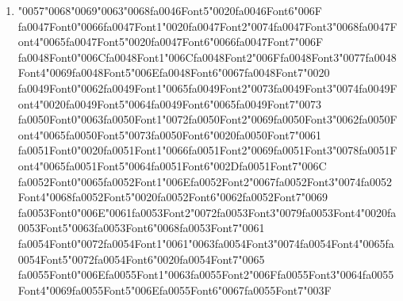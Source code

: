 \documentclass[11pt]{article}
\begin{document}
\begin{enumerate}[leftmargin=*]
  \item {\char"0057}{\char"0068}{\char"0069}{\char"0063}{\char"0068}{\csname fa0046Font5\endcsname\char"0020}{\csname fa0046Font6\endcsname\char"006F} {\csname fa0047Font0\endcsname\char"0066}{\csname fa0047Font1\endcsname\char"0020}{\csname fa0047Font2\endcsname\char"0074}{\csname fa0047Font3\endcsname\char"0068}{\csname fa0047Font4\endcsname\char"0065}{\csname fa0047Font5\endcsname\char"0020}{\csname fa0047Font6\endcsname\char"0066}{\csname fa0047Font7\endcsname\char"006F} {\csname fa0048Font0\endcsname\char"006C}{\csname fa0048Font1\endcsname\char"006C}{\csname fa0048Font2\endcsname\char"006F}{\csname fa0048Font3\endcsname\char"0077}{\csname fa0048Font4\endcsname\char"0069}{\csname fa0048Font5\endcsname\char"006E}{\csname fa0048Font6\endcsname\char"0067}{\csname fa0048Font7\endcsname\char"0020} {\csname fa0049Font0\endcsname\char"0062}{\csname fa0049Font1\endcsname\char"0065}{\csname fa0049Font2\endcsname\char"0073}{\csname fa0049Font3\endcsname\char"0074}{\csname fa0049Font4\endcsname\char"0020}{\csname fa0049Font5\endcsname\char"0064}{\csname fa0049Font6\endcsname\char"0065}{\csname fa0049Font7\endcsname\char"0073} {\csname fa0050Font0\endcsname\char"0063}{\csname fa0050Font1\endcsname\char"0072}{\csname fa0050Font2\endcsname\char"0069}{\csname fa0050Font3\endcsname\char"0062}{\csname fa0050Font4\endcsname\char"0065}{\csname fa0050Font5\endcsname\char"0073}{\csname fa0050Font6\endcsname\char"0020}{\csname fa0050Font7\endcsname\char"0061} {\csname fa0051Font0\endcsname\char"0020}{\csname fa0051Font1\endcsname\char"0066}{\csname fa0051Font2\endcsname\char"0069}{\csname fa0051Font3\endcsname\char"0078}{\csname fa0051Font4\endcsname\char"0065}{\csname fa0051Font5\endcsname\char"0064}{\csname fa0051Font6\endcsname\char"002D}{\csname fa0051Font7\endcsname\char"006C} {\csname fa0052Font0\endcsname\char"0065}{\csname fa0052Font1\endcsname\char"006E}{\csname fa0052Font2\endcsname\char"0067}{\csname fa0052Font3\endcsname\char"0074}{\csname fa0052Font4\endcsname\char"0068}{\csname fa0052Font5\endcsname\char"0020}{\csname fa0052Font6\endcsname\char"0062}{\csname fa0052Font7\endcsname\char"0069} {\csname fa0053Font0\endcsname\char"006E}{\char"0061}{\csname fa0053Font2\endcsname\char"0072}{\csname fa0053Font3\endcsname\char"0079}{\csname fa0053Font4\endcsname\char"0020}{\csname fa0053Font5\endcsname\char"0063}{\csname fa0053Font6\endcsname\char"0068}{\csname fa0053Font7\endcsname\char"0061} {\csname fa0054Font0\endcsname\char"0072}{\csname fa0054Font1\endcsname\char"0061}{\char"0063}{\csname fa0054Font3\endcsname\char"0074}{\csname fa0054Font4\endcsname\char"0065}{\csname fa0054Font5\endcsname\char"0072}{\csname fa0054Font6\endcsname\char"0020}{\csname fa0054Font7\endcsname\char"0065} {\csname fa0055Font0\endcsname\char"006E}{\csname fa0055Font1\endcsname\char"0063}{\csname fa0055Font2\endcsname\char"006F}{\csname fa0055Font3\endcsname\char"0064}{\csname fa0055Font4\endcsname\char"0069}{\csname fa0055Font5\endcsname\char"006E}{\csname fa0055Font6\endcsname\char"0067}{\csname fa0055Font7\endcsname\char"003F}

\end{enumerate}
\end{document}
